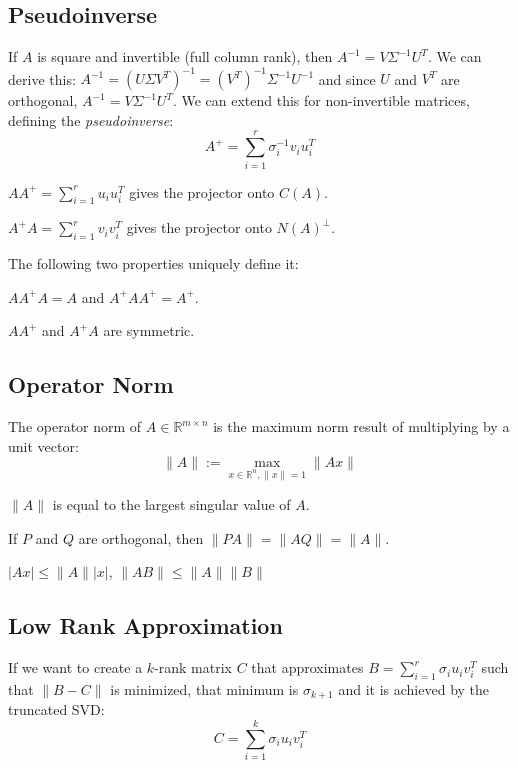 \documentclass[10pt]{extarticle}
\newcommand{\R}{\mathbb{R}}
\begin{document}
\begin{multicols*}{2}
\subsection{Pseudoinverse}
If $A$ is square and invertible (full column rank), then $A^{-1} = V\Sigma^{-1}U^T$. We can derive this: $A^{-1} = (U\Sigma V^T)^{-1} = (V^T)^{-1} \Sigma^{-1} U^{-1}$ and since $U$ and $V^T$ are orthogonal, $A^{-1} = V\Sigma^{-1} U^T$. We can extend this for non-invertible matrices, defining the \emph{pseudoinverse}:
\[ A^+ = \sum_{i=1}^r \sigma_i^{-1} v_i u_i^T \]

\begin{compactitem}
	\item $AA^+ = \sum_{i=1}^r u_i u_i^T$ gives the projector onto $C(A)$.	
	\item $A^+A = \sum_{i=1}^r v_i v_i^T$ gives the projector onto $N(A)^\bot$.	
\end{compactitem}
The following two properties uniquely define it:
\begin{compactitem}
	\item $AA^+ A = A$ and $A^+ A A^+ = A^+$. 
	\item $AA^+$ and $A^+ A$ are symmetric.
\end{compactitem}


\subsection{Operator Norm}
The operator norm of $A \in \R^{m \times n}$ is the maximum norm result of multiplying by a unit vector:
\[ \| A \| := \max_{x \in \R^n, \|x\| = 1} \|Ax\| \]

\begin{compactitem}
\item $\|A\|$ is equal to the largest singular value of $A$.
\item If $P$ and $Q$ are orthogonal, then $\|PA\| = \|AQ\| = \|A\|$.
\item $|Ax| \leq \| A \| |x|$, $\|AB\| \leq \|A\| \| B \|$
\end{compactitem}

\subsection{Low Rank Approximation}
If we want to create a $k$-rank matrix $C$ that approximates $B = \sum_{i=1}^{r} \sigma_i u_i v_i^T$ such that $\| B - C \|$ is minimized, that minimum is $\sigma_{k+1}$ and it is achieved by the truncated SVD:
\[ C = \sum_{i=1}^k \sigma_i u_i v_i^T \]


\end{multicols*}
\end{document}
